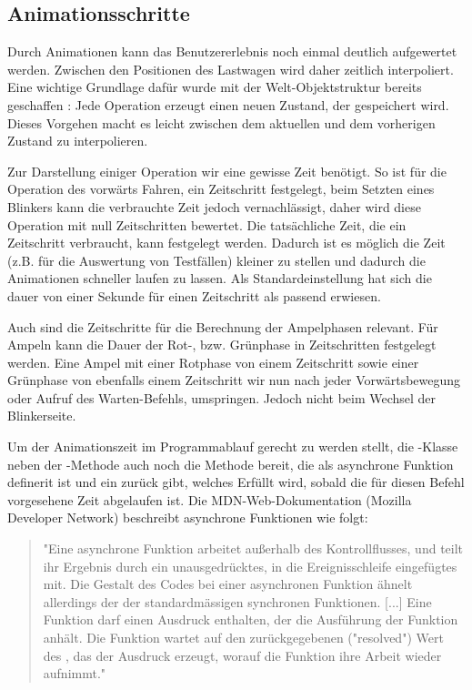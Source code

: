 \subsection{Animationsschritte}
\label{sec:implementation:rendering:animation}

Durch Animationen kann das Benutzererlebnis noch einmal deutlich aufgewertet werden. Zwischen den Positionen des Lastwagen wird daher zeitlich interpoliert. Eine wichtige Grundlage dafür wurde mit der Welt-Objektstruktur bereits geschaffen : Jede Operation erzeugt einen neuen Zustand, der gespeichert wird. Dieses Vorgehen macht es leicht zwischen dem aktuellen und dem vorherigen Zustand zu interpolieren.

Zur Darstellung einiger Operation wir eine gewisse Zeit benötigt. So ist für die Operation des vorwärts Fahren, ein Zeitschritt festgelegt, beim Setzten eines Blinkers kann die verbrauchte Zeit jedoch vernachlässigt, daher wird diese Operation mit null Zeitschritten bewertet. Die tatsächliche Zeit, die ein Zeitschritt verbraucht, kann festgelegt werden. Dadurch ist es möglich die Zeit (z.B. für die Auswertung von Testfällen) kleiner zu stellen und dadurch die Animationen schneller laufen zu lassen. Als Standardeinstellung hat sich die dauer von einer Sekunde für einen Zeitschritt als passend erwiesen.

Auch sind die Zeitschritte für die Berechnung der Ampelphasen relevant. Für Ampeln kann die Dauer der Rot-, bzw. Grünphase in Zeitschritten festgelegt werden. Eine Ampel mit einer Rotphase von einem Zeitschritt sowie einer Grünphase von ebenfalls einem Zeitschritt wir nun nach jeder Vorwärtsbewegung oder Aufruf des Warten-Befehls, umspringen. Jedoch nicht beim Wechsel der Blinkerseite. 

Um der Animationszeit im Programmablauf gerecht zu werden stellt, die -Klasse neben der -Methode auch noch die Methode  bereit, die als asynchrone Funktion definerit ist und ein  zurück gibt, welches Erfüllt wird, sobald die für diesen Befehl vorgesehene Zeit abgelaufen ist. Die MDN-Web-Dokumentation (Mozilla Developer Network) beschreibt asynchrone Funktionen wie folgt:

\begin{quote}
  "Eine asynchrone Funktion arbeitet außerhalb des Kontrollflusses, und teilt ihr Ergebnis durch ein unausgedrücktes, in die Ereignisschleife eingefügtes  mit. Die Gestalt des Codes bei einer asynchronen Funktion ähnelt allerdings der der standardmässigen synchronen Funktionen. [...] Eine  Funktion darf einen  Ausdruck enthalten, der die Ausführung der Funktion anhält. Die Funktion wartet auf den zurückgegebenen ("resolved") Wert des , das der  Ausdruck erzeugt, worauf die Funktion ihre Arbeit wieder aufnimmt."~\cite{mdn-async-function}
\end{quote}

